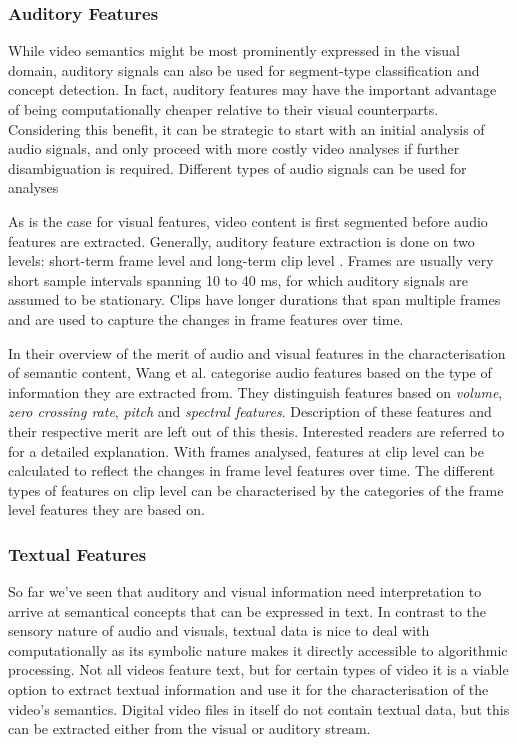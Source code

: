 \subsubsection{Auditory Features}

While video semantics might be most prominently expressed in the visual domain, auditory signals can also be used for segment-type classification and concept detection. In fact, auditory features may have the important advantage of being computationally cheaper relative to their visual counterparts. Considering this benefit, it can be strategic to start with an initial analysis of audio signals, and only proceed with more costly video analyses if further disambiguation is required. Different types of audio signals can be used for analyses 

As is the case for visual features, video content is first segmented before audio features are extracted. Generally, auditory feature extraction is done on two levels: short-term frame level and long-term clip level \cite{Wang:2000vf}. Frames are usually very short sample intervals spanning 10 to 40 ms, for which auditory signals are assumed to be stationary. Clips have longer durations that span multiple frames and are used to capture the changes in frame features over time.

In their overview of the merit of audio and visual features in the characterisation of semantic content, Wang et al. categorise audio features based on the type of information they are extracted from. They distinguish features based on \emph{volume}, \emph{zero crossing rate}, \emph{pitch} and \emph{spectral features}. Description of these features and their respective merit are left out of this thesis. Interested readers are referred to \cite{Wang:2000vf} for a detailed explanation. With frames analysed, features at clip level can be calculated to reflect the changes in frame level features over time. The different types of features on clip level can be characterised by the categories of the frame level features they are based on.

\subsubsection{Textual Features}

So far we've seen that auditory and visual information need interpretation to arrive at semantical concepts that can be expressed in text. In contrast to the sensory nature of audio and visuals, textual data is nice to deal with computationally as its symbolic nature makes it directly accessible to algorithmic processing. Not all videos feature text, but for certain types of video it is a viable option to extract textual information and use it for the characterisation of the video's semantics. Digital video files in itself do not contain textual data, but this can be extracted either from the visual or auditory stream.

